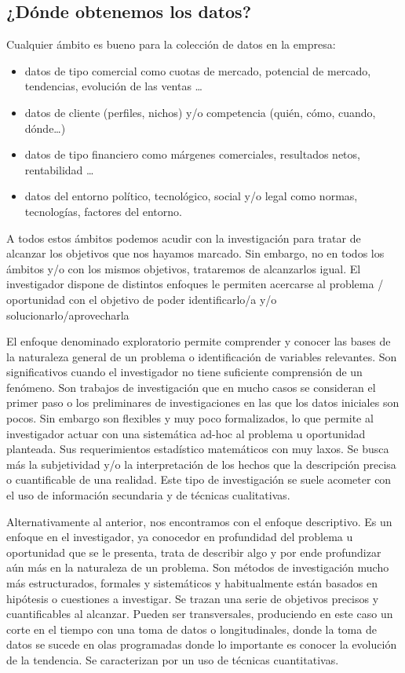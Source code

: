 \documentclass[
]{book}
\providecommand{\tightlist}{%
  \setlength{\itemsep}{0pt}\setlength{\parskip}{0pt}}
\begin{document}
\hypertarget{duxf3nde-obtenemos-los-datos}{%
\subsection{¿Dónde obtenemos los datos?}\label{duxf3nde-obtenemos-los-datos}}

Cualquier ámbito es bueno para la colección de datos en la empresa:

\begin{itemize}
\tightlist
\item
  datos de tipo comercial como cuotas de mercado, potencial de mercado, tendencias, evolución de las ventas \ldots{}
\item
  datos de cliente (perfiles, nichos) y/o competencia (quién, cómo, cuando, dónde\ldots)
\item
  datos de tipo financiero como márgenes comerciales, resultados netos, rentabilidad \ldots{}
\item
  datos del entorno político, tecnológico, social y/o legal como normas, tecnologías, factores del entorno.
\end{itemize}

A todos estos ámbitos podemos acudir con la investigación para tratar de alcanzar los objetivos que nos hayamos marcado. Sin embargo, no en todos los ámbitos y/o con los mismos objetivos, trataremos de alcanzarlos igual. El investigador dispone de distintos enfoques le permiten acercarse al problema / oportunidad con el objetivo de poder identificarlo/a y/o solucionarlo/aprovecharla

El enfoque denominado exploratorio permite comprender y conocer las bases de la naturaleza general de un problema o identificación de variables relevantes. Son significativos cuando el investigador no tiene suficiente comprensión de un fenómeno. Son trabajos de investigación que en mucho casos se consideran el primer paso o los preliminares de investigaciones en las que los datos iniciales son pocos. Sin embargo son flexibles y muy poco formalizados, lo que permite al investigador actuar con una sistemática ad-hoc al problema u oportunidad planteada. Sus requerimientos estadístico matemáticos con muy laxos. Se busca más la subjetividad y/o la interpretación de los hechos que la descripción precisa o cuantificable de una realidad. Este tipo de investigación se suele acometer con el uso de información secundaria y de técnicas cualitativas.

Alternativamente al anterior, nos encontramos con el enfoque descriptivo. Es un enfoque en el investigador, ya conocedor en profundidad del problema u oportunidad que se le presenta, trata de describir algo y por ende profundizar aún más en la naturaleza de un problema. Son métodos de investigación mucho más estructurados, formales y sistemáticos y habitualmente están basados en hipótesis o cuestiones a investigar. Se trazan una serie de objetivos precisos y cuantificables al alcanzar. Pueden ser transversales, produciendo en este caso un corte en el tiempo con una toma de datos o longitudinales, donde la toma de datos se sucede en olas programadas donde lo importante es conocer la evolución de la tendencia. Se caracterizan por un uso de técnicas cuantitativas.
\end{document}
